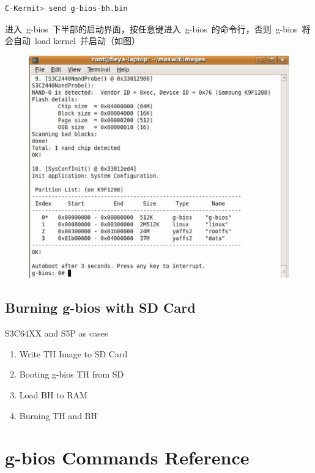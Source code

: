 \documentclass[a4paper,11pt]{book}
\begin{document}
\begin{lstlisting}[language=bash,numbers=none]
C-Kermit> send g-bios-bh.bin
\end{lstlisting}
进入~g-bios~下半部的启动界面，按任意键进入~g-bios~的命令行，否则~g-bios~将会自动~load kernel~并启动（如图）

\begin{figure}[H]
\centering
\includegraphics[width=5in]{image/step4.eps}
\end{figure}

\section{Burning g-bios with SD Card}
S3C64XX and S5P as cases

\begin{enumerate}
\item Write TH Image to SD Card
\item Booting g-bios TH from SD
\item Load BH to RAM
\item Burning TH and BH
\end{enumerate}

\chapter{g-bios Commands Reference}

\end{document}
